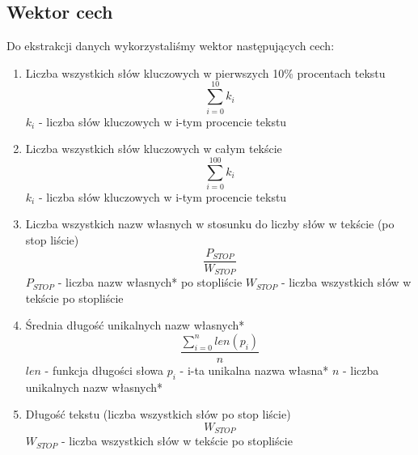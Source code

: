 \documentclass{classrep}
\begin{document}
\subsection{Wektor cech}
Do ekstrakcji danych wykorzystaliśmy wektor następujących cech:
\begin{enumerate}
  \item Liczba wszystkich słów kluczowych w pierwszych 10\% procentach tekstu
  \newline 
  \begin{equation}
  	\sum_{i=0}^{10}k_i
  \end{equation}
   \newline \quad $k_i$ - liczba słów kluczowych w i-tym procencie tekstu
   
  \item Liczba wszystkich słów kluczowych w całym tekście
 \newline 
  \begin{equation}
  	\sum_{i=0}^{100}k_i
  \end{equation}
  \newline\quad $k_i$ - liczba słów kluczowych w i-tym procencie tekstu
  
  \item Liczba wszystkich nazw własnych w stosunku do liczby słów w tekście (po stop liście)
  \newline 
  \begin{equation}
  	\frac{P_{STOP}}{W_{STOP}}
  \end{equation}
  \newline \quad $P_{STOP}$ - liczba nazw własnych* po stopliście
  \newline \quad $W_{STOP}$ - liczba wszystkich słów w tekście po stopliście
  
  \item Średnia długość unikalnych nazw własnych*
  \newline
  \begin{equation}
  	\frac{\sum_{i=0}^nlen(p_i)}{n}
  \end{equation}
  \newline \quad $len$ - funkcja długości słowa
  \newline \quad $p_i$ - i-ta unikalna nazwa własna*
  \newline \quad $n$ - liczba unikalnych nazw własnych*
  
  \item Długość tekstu (liczba wszystkich słów po stop liście)
  \begin{equation}
  	W_{STOP}
  \end{equation}
  \newline \quad $W_{STOP}$ - liczba wszystkich słów w tekście po stopliście
  

\end{enumerate}
\end{document}
